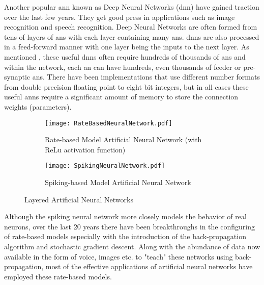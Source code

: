 Another popular \ac{ann} known as Deep Neural Networks (\ac{dnn}) \cite{aizenberg2013multi}\cite{doi:10.1162/neco.2006.18.7.1527} have gained traction over the last few years. They get good press in applications such as image recognition and speech recognition. 
Deep Neural Networks are often formed from tens of layers of \ac{an}s with each layer containing many \ac{an}s. \ac{dnn}s are also processed in a feed-forward manner with one layer being the inputs to the next layer. 
As mentioned \cite{krizhevsky2012imagenet}, these useful \ac{dnn}s often require hundreds of thousands of \ac{an}s and within the network, each \ac{an} can have hundreds, even thousands of feeder or pre-synaptic \ac{an}s.
There have been implementations that use different number formats from double precision floating point to eight bit integers, but in all cases these useful \ac{ann}s require a significant amount of memory to store the connection weights (parameters).


\begin{figure}[!t]
  \centering
  \captionsetup{justification=centering}
  \captionsetup{width=.9\linewidth}
  \begin{subfigure}{.9\textwidth}
    \centerline{
    \mbox{\texttt{[image: RateBasedNeuralNetwork.pdf]}}
    }
    \caption{Rate-based Model Artificial Neural Network (with ReLu activation function)}
    \label{fig:Rate-based Model Network}
  \end{subfigure}
  
  \begin{subfigure}{.9\textwidth}
    \centerline{
    \mbox{\texttt{[image: SpikingNeuralNetwork.pdf]}}
    }
    \caption{Spiking-based Model Artificial Neural Network}
    \label{fig:Spiking Model Network}
  \end{subfigure}
  \caption{Layered Artificial Neural Networks}
  \label{fig:Layered Artificial Neural Networks}
\end{figure}

Although the spiking neural network more closely models the behavior of real neurons, over the last 20 years there 
have been breakthroughs in the configuring of rate-based models especially with the introduction of the back-propagation
algorithm and stochastic gradient descent. Along with the abundance of data now available in the form of voice, images etc. to "teach" these networks
using back-propagation, most of the effective applications of artificial neural networks have employed these rate-based models.

